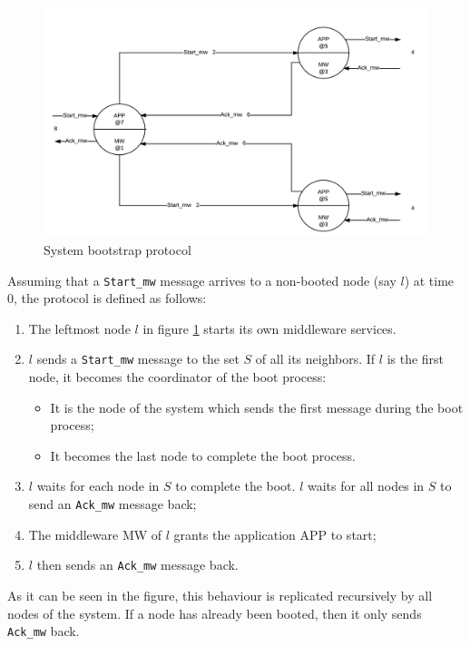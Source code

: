 \begin{figure}[H]
  \centering
  \includegraphics[width=\columnwidth]{sections/images/solution/bootstrap.pdf}
  \caption{System bootstrap protocol}
  \label{fig:sys-bootstrap-protocol}
\end{figure}

Assuming that a \texttt{Start\_mw} message arrives to a non-booted node (say
$l$) at time 0, the protocol is defined as follows:

\begin{enumerate}
  \item The leftmost node $l$ in figure \ref{fig:sys-bootstrap-protocol}
    starts its own middleware services.  
  \item $l$ sends a \texttt{Start\_mw} message to the set $S$ of all its 
neighbors. If $l$ is the first node, it becomes the coordinator of the boot 
process: 
  \begin{itemize}
    \item It is the node of the system which sends the first message during 
the boot process;
    \item It becomes the last node to complete the boot process.
  \end{itemize} 
  \item $l$ waits for each node in $S$ to complete the boot. $l$ waits for all 
nodes in $S$ to send an \texttt{Ack\_mw} message back;
  \item The middleware MW of $l$ grants the application APP to start;
  \item $l$ then sends an \texttt{Ack\_mw} message back.
\end{enumerate}

As it can be seen in the figure, this behaviour is replicated recursively
by all nodes of the system. If a node has already been booted, then it only
sends \texttt{Ack\_mw} back.

